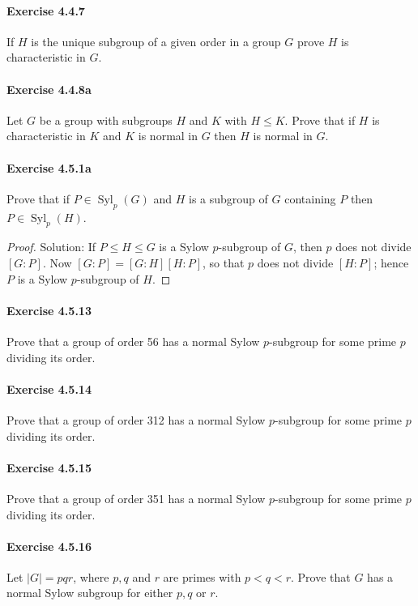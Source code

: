 \documentclass{article}
\theoremstyle{definition}
\begin{document}
\paragraph{Exercise 4.4.7} If $H$ is the unique subgroup of a given order in a group $G$ prove $H$ is characteristic in $G$.

\paragraph{Exercise 4.4.8a} Let $G$ be a group with subgroups $H$ and $K$ with $H \leq K$. Prove that if $H$ is characteristic in $K$ and $K$ is normal in $G$ then $H$ is normal in $G$.

\paragraph{Exercise 4.5.1a} Prove that if $P \in \operatorname{Syl}_{p}(G)$ and $H$ is a subgroup of $G$ containing $P$ then $P \in \operatorname{Syl}_{p}(H)$.
\begin{proof}
    Solution: If $P \leq H \leq G$ is a Sylow $p$-subgroup of $G$, then $p$ does not divide $[G: P]$. Now $[G: P]=[G: H][H: P]$, so that $p$ does not divide $[H: P]$; hence $P$ is a Sylow $p$-subgroup of $H$.
\end{proof}


\paragraph{Exercise 4.5.13} Prove that a group of order 56 has a normal Sylow $p$-subgroup for some prime $p$ dividing its order.

\paragraph{Exercise 4.5.14} Prove that a group of order 312 has a normal Sylow $p$-subgroup for some prime $p$ dividing its order.

\paragraph{Exercise 4.5.15} Prove that a group of order 351 has a normal Sylow $p$-subgroup for some prime $p$ dividing its order.

\paragraph{Exercise 4.5.16} Let $|G|=p q r$, where $p, q$ and $r$ are primes with $p<q<r$. Prove that $G$ has a normal Sylow subgroup for either $p, q$ or $r$.
\end{document}
